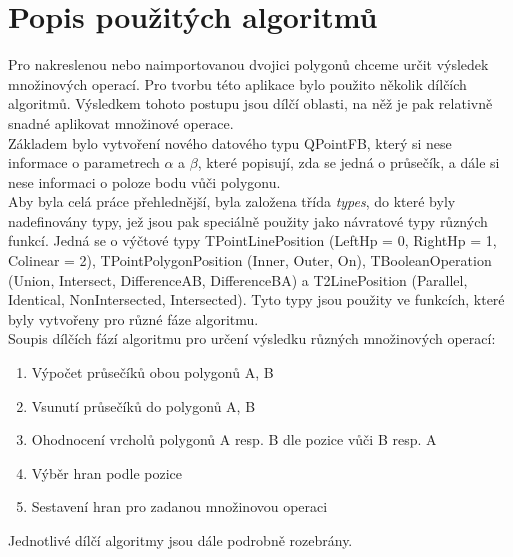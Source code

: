 \documentclass[a4paper,11pt,twoside]{article}
\begin{document}

\newpage
\vspace*{-1cm}
\renewcommand{\baselinestretch}{1.4} %
\pagestyle{fancy}
\section{Popis použitých algoritmů}
Pro nakreslenou nebo naimportovanou dvojici polygonů chceme určit výsledek množinových operací. Pro tvorbu této aplikace bylo použito několik dílčích algoritmů. Výsledkem tohoto postupu jsou dílčí oblasti, na něž je pak relativně snadné aplikovat množinové operace. \\
\indent Základem bylo vytvoření nového datového typu QPointFB, který si nese informace o parametrech $\alpha$ a $\beta$, které popisují, zda se jedná o průsečík, a dále si nese informaci o poloze bodu vůči polygonu. \\
\indent Aby byla celá práce přehlednější, byla založena třída \textit{types}, do které byly nadefinovány typy, jež jsou pak speciálně použity jako návratové typy různých funkcí. Jedná se o výčtové typy TPointLinePosition (LeftHp = 0, RightHp = 1, Colinear = 2), TPointPolygonPosition (Inner, Outer, On), TBooleanOperation (Union, Intersect, DifferenceAB, DifferenceBA) a T2LinePosition (Parallel, Identical, NonIntersected, Intersected). Tyto typy jsou použity ve funkcích, které byly vytvořeny pro různé fáze algoritmu.\\

\noindent Soupis dílčích fází algoritmu pro určení výsledku různých množinových operací:
\begin{enumerate}
\item Výpočet průsečíků obou polygonů A, B
\item Vsunutí průsečíků do polygonů A, B
\item Ohodnocení vrcholů polygonů A resp. B dle pozice vůči B resp. A
\item Výběr hran podle pozice
\item Sestavení hran pro zadanou množinovou operaci
\end{enumerate}

\noindent Jednotlivé dílčí algoritmy jsou dále podrobně rozebrány.

\newpage
\vspace*{-1cm}
\end{document}
